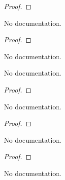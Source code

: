 \begin{proof}
    \leanok
\end{proof}

\begin{theorem}\label{Int.eq_neg_one_of_dvd_neg_one}
        \leanok
                No documentation.
    \end{theorem}

\begin{proof}
    \leanok
\end{proof}

\begin{theorem}\label{WithZero.ofAdd_eq_neg_one_of_pow_eq_neg_one}
                No documentation.
    \end{theorem}

\begin{lemma}\label{eq_one_of_eq_one_of_le_one_le_one}
        \leanok
                No documentation.
    \end{lemma}

\begin{proof}
    \leanok
\end{proof}

\begin{theorem}\label{map_zpow}
        \leanok
                No documentation.
    \end{theorem}

\begin{proof}
    \leanok
\end{proof}

\begin{theorem}\label{val_valuationSubring_unit}
        \leanok
                No documentation.
    \end{theorem}

\begin{proof}
    \leanok
\end{proof}

\begin{theorem}\label{isUnit_in_valuationSubring_of_val_eq_one}
        \leanok
                No documentation.
    \end{theorem}

